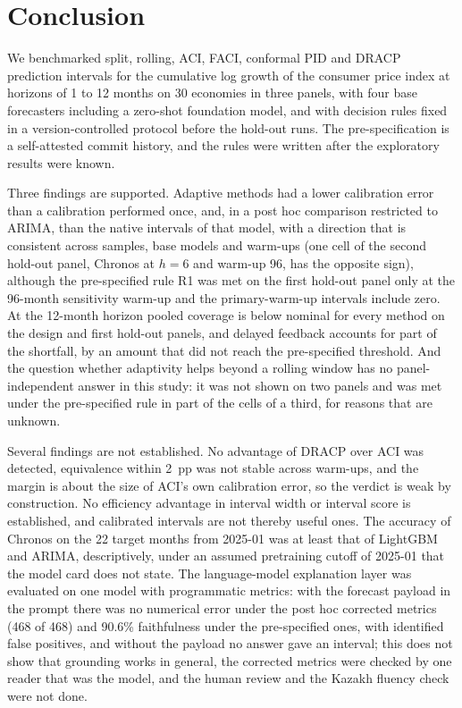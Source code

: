 \section{Conclusion}\label{sec:conclusion}

We benchmarked split, rolling, ACI, FACI, conformal PID and DRACP prediction intervals for the cumulative log growth of the consumer price index at horizons of 1 to 12 months on 30 economies in three panels, with four base forecasters including a zero-shot foundation model, and with decision rules fixed in a version-controlled protocol before the hold-out runs. The pre-specification is a self-attested commit history, and the rules were written after the exploratory results were known.

Three findings are supported. Adaptive methods had a lower calibration error than a calibration performed once, and, in a post hoc comparison restricted to ARIMA, than the native intervals of that model, with a direction that is consistent across samples, base models and warm-ups (one cell of the second hold-out panel, Chronos at $h=6$ and warm-up 96, has the opposite sign), although the pre-specified rule R1 was met on the first hold-out panel only at the 96-month sensitivity warm-up and the primary-warm-up intervals include zero. At the 12-month horizon pooled coverage is below nominal for every method on the design and first hold-out panels, and delayed feedback accounts for part of the shortfall, by an amount that did not reach the pre-specified threshold. And the question whether adaptivity helps beyond a rolling window has no panel-independent answer in this study: it was not shown on two panels and was met under the pre-specified rule in part of the cells of a third, for reasons that are unknown.

Several findings are not established. No advantage of DRACP over ACI was detected, equivalence within 2~pp was not stable across warm-ups, and the margin is about the size of ACI's own calibration error, so the verdict is weak by construction. No efficiency advantage in interval width or interval score is established, and calibrated intervals are not thereby useful ones. The accuracy of Chronos on the 22 target months from 2025-01 was at least that of LightGBM and ARIMA, descriptively, under an assumed pretraining cutoff of 2025-01 that the model card does not state. The language-model explanation layer was evaluated on one model with programmatic metrics: with the forecast payload in the prompt there was no numerical error under the post hoc corrected metrics (468 of 468) and 90.6\% faithfulness under the pre-specified ones, with identified false positives, and without the payload no answer gave an interval; this does not show that grounding works in general, the corrected metrics were checked by one reader that was the model, and the human review and the Kazakh fluency check were not done.

